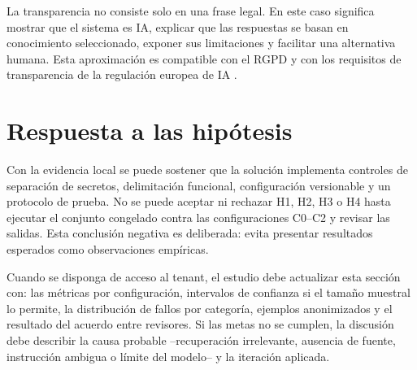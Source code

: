 La transparencia no consiste solo en una frase legal. En este caso significa mostrar que el sistema es IA, explicar que las respuestas se basan en conocimiento seleccionado, exponer sus limitaciones y facilitar una alternativa humana. Esta aproximaci\'on es compatible con el RGPD y con los requisitos de transparencia de la regulaci\'on europea de IA \cite{gdpr,aiAct}.

\section{Respuesta a las hip\'otesis}

Con la evidencia local se puede sostener que la soluci\'on implementa controles de separaci\'on de secretos, delimitaci\'on funcional, configuraci\'on versionable y un protocolo de prueba. No se puede aceptar ni rechazar H1, H2, H3 o H4 hasta ejecutar el conjunto congelado contra las configuraciones C0--C2 y revisar las salidas. Esta conclusi\'on negativa es deliberada: evita presentar resultados esperados como observaciones emp\'iricas.

Cuando se disponga de acceso al tenant, el estudio debe actualizar esta secci\'on con: las m\'etricas por configuraci\'on, intervalos de confianza si el tama\~no muestral lo permite, la distribuci\'on de fallos por categor\'ia, ejemplos anonimizados y el resultado del acuerdo entre revisores. Si las metas no se cumplen, la discusi\'on debe describir la causa probable --recuperaci\'on irrelevante, ausencia de fuente, instrucci\'on ambigua o l\'imite del modelo-- y la iteraci\'on aplicada.
